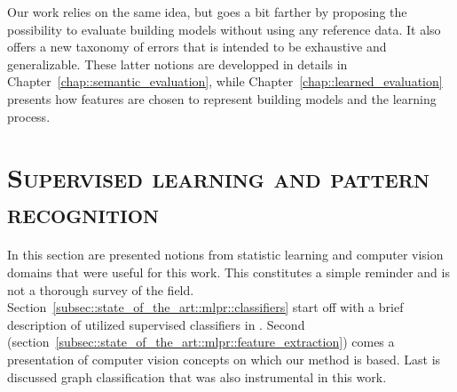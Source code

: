         Our work relies on the same idea, but goes a bit farther by proposing the possibility to evaluate building models without using any reference data.
        It also offers a new taxonomy of errors that is intended to be exhaustive and generalizable.
        These latter notions are developped in details in Chapter~\ref{chap::semantic_evaluation}, while Chapter~\ref{chap::learned_evaluation} presents how features are chosen to represent building models and the learning process.

\section{\textsc{Supervised learning and pattern recognition}}
    \label{sec::state_of_the_art::mlpr}
    In this section are presented notions from statistic learning and computer vision domains that were useful for this work.
    This constitutes a simple reminder and is not a thorough survey of the field.
    Section~\ref{subsec::state_of_the_art::mlpr::classifiers} start off with a brief description of utilized supervised classifiers in .
    Second (section~\ref{subsec::state_of_the_art::mlpr::feature_extraction}) comes a presentation of computer vision concepts on which our method is based.
    Last is discussed graph classification that was also instrumental in this work.

